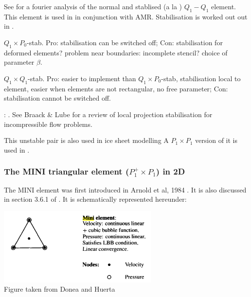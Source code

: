\begin{minipage}[t]{0.5\textwidth}

\end{minipage}
\begin{minipage}[t]{0.5\textwidth}

\end{minipage}

See \cite{nosi01} for a fourier analysis of the normal and stablised (a la \cite{hufb86}) $Q_1-Q_1$ element.
This element is used in \cite{bugs09,busa13} in conjunction with AMR. 
Stabilisation is worked out out in \cite{dobo04,bodg06,bodo06}.

$Q_1\times P_0$-stab. Pro: stabilisation can be switched off; Con: stabilisation for deformed elements? 
problem near boundaries: incomplete stencil? choice of parameter $\beta$.

$Q_1\times Q_1$-stab. Pro: easier to implement than $Q_1\times P_0$-stab, stabilisation local to element, easier when elements are not rectangular, no free parameter; Con: stabilisation cannot be switched off.

\Literature: \cite{shry78,temr92,tezd92,grcc95,idsn95,knto00,fros07,lihc09}. See Braack \& Lube \cite{brlu09}
for a review of local projection stabilisation for incompressible flow problems. 

This unstable pair is also used in ice sheet modelling \cite{heah18,zhjg11,zwgg07}
A $P_1\times P_1$ version of it is used in \cite{kahp20}.


\subsubsection{The MINI triangular element ($P_1^+\times P_1$) in 2D}
\label{pair:mini}

The  MINI element was first introduced in Arnold et al, 1984 \cite{arbf84}.
It is also discussed in section 3.6.1 of \cite{john16}.
It is schematically represented hereunder:

\begin{center}
\includegraphics[width=8cm]{images/mini/minielement}\\
{\captionfont Figure taken from Donea and Huerta \cite{dohu03}}
\end{center}

